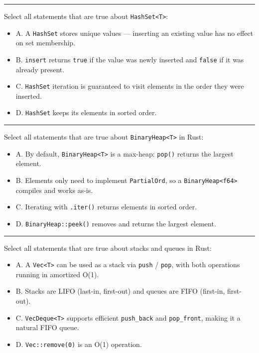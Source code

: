 \documentclass[
  11pt,
]{article}
\providecommand{\tightlist}{%
  \setlength{\itemsep}{0pt}\setlength{\parskip}{0pt}}
\begin{document}
\begin{center}\rule{0.5\linewidth}{0.5pt}\end{center}

Select all statements that are true about
\texttt{HashSet\textless{}T\textgreater{}}:

\begin{itemize}
\tightlist
\item[$\square$]
  A. A \texttt{HashSet} stores unique values --- inserting an existing
  value has no effect on set membership.
\item[$\square$]
  B. \texttt{insert} returns \texttt{true} if the value was newly
  inserted and \texttt{false} if it was already present.
\item[$\square$]
  C. \texttt{HashSet} iteration is guaranteed to visit elements in the
  order they were inserted.
\item[$\square$]
  D. \texttt{HashSet} keeps its elements in sorted order.
\end{itemize}

\begin{center}\rule{0.5\linewidth}{0.5pt}\end{center}

Select all statements that are true about
\texttt{BinaryHeap\textless{}T\textgreater{}} in Rust:

\begin{itemize}
\tightlist
\item[$\square$]
  A. By default, \texttt{BinaryHeap\textless{}T\textgreater{}} is a
  max-heap: \texttt{pop()} returns the largest element.
\item[$\square$]
  B. Elements only need to implement \texttt{PartialOrd}, so a
  \texttt{BinaryHeap\textless{}f64\textgreater{}} compiles and works
  as-is.
\item[$\square$]
  C. Iterating with \texttt{.iter()} returns elements in sorted order.
\item[$\square$]
  D. \texttt{BinaryHeap::peek()} removes and returns the largest
  element.
\end{itemize}

\begin{center}\rule{0.5\linewidth}{0.5pt}\end{center}

Select all statements that are true about stacks and queues in Rust:

\begin{itemize}
\tightlist
\item[$\square$]
  A. A \texttt{Vec\textless{}T\textgreater{}} can be used as a stack via
  \texttt{push} / \texttt{pop}, with both operations running in
  amortized O(1).
\item[$\square$]
  B. Stacks are LIFO (last-in, first-out) and queues are FIFO (first-in,
  first-out).
\item[$\square$]
  C. \texttt{VecDeque\textless{}T\textgreater{}} supports efficient
  \texttt{push\_back} and \texttt{pop\_front}, making it a natural FIFO
  queue.
\item[$\square$]
  D. \texttt{Vec::remove(0)} is an O(1) operation.
\end{itemize}
\end{document}
